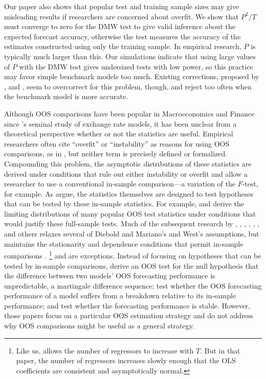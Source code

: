 \documentclass[11pt]{article}
\newcommand{\citepos}[1]{\citeauthor{#1}'s \citeyearpar{#1}}
\begin{document}
Our paper also shows that popular test and training sample sizes may
give misleading results if researchers are concerned about overfit.
We show that $P^2/T$ must converge to zero for the DMW test to give
valid inference about the expected forecast accuracy, otherwise the
test measures the accuracy of the estimates constructed using only the
training sample.  In empirical research, $P$ is typically much larger
than this.  Our simulations indicate that using large values of $P$
with the DMW test gives undersized tests with low power, so this
practice may favor simple benchmark models too much.  Existing
corrections, proposed by \citet{ClM:01,ClM:05}, \citet{Mcc:07} and
\citet{ClW:06,ClW:07}, seem to overcorrect for this problem, though, and reject
too often when the benchmark model is more accurate.


Although OOS comparisons have been popular in Macroeconomics and
Finance since \citepos{MeR:83} seminal study of exchange rate models,
it has been unclear from a theoretical perspective whether or not the
statistics are useful.  Empirical researchers often cite ``overfit''
or ``instability'' as reasons for using OOS comparisons, as in
\citet{StW:03}, but neither term is precisely defined or formalized.
Compounding this problem, the asymptotic distributions of these
statistics are derived under conditions that rule out either
instability or overfit and allow a researcher to use a conventional
in-sample comparison---a variation of the $F$-test, for example.  As
\citet{InK:04} argue, the statistics themselves are designed to test
hypotheses that can be tested by these in-sample statistics.  For
example, \citet{DiM:95} and \citet{Wes:96} derive the limiting
distributions of many popular OOS test statistics under conditions
that would justify these full-sample tests.  Much
of the subsequent research by \citet{Mcc:00, Mcc:07}, \citet{CCS:01},
\citet{ClM:01,ClM:05}, \citet{CoS:02,CoS:04}, \citet{ClW:06,ClW:07},
\citet{Ana:07}, and others relaxes several of Diebold and Mariano's
and West's assumptions, but maintains the stationarity and dependence
conditions that permit in-sample comparisons \citep[see][for a
review of this literature]{Wes:06}.%
\footnote{Like us, \citet{Ana:07} allows the number of regressors to
  increase with $T$.  But in that paper, the number of regressors
  increases slowly enough that the OLS coefficients are consistent and
  asymptotically normal.} %
\citet{GiW:06} and
\citet{GiR:09, GiR:10} are exceptions.  Instead of focusing on
hypotheses that can be tested by in-sample comparisons, \citet{GiW:06}
derive an OOS test for the null hypothesis that the difference
between two models' OOS forecasting performance is unpredictable, a
martingale difference sequence; \citet{GiR:09} test whether the OOS
forecasting performance of a model suffers from a breakdown relative
to its in-sample performance; and \citet{GiR:10} test whether the
forecasting performance is stable. However, those papers focus on a
particular OOS estimation strategy and do not address why OOS
comparisons might be useful as a general strategy.
\end{document}
